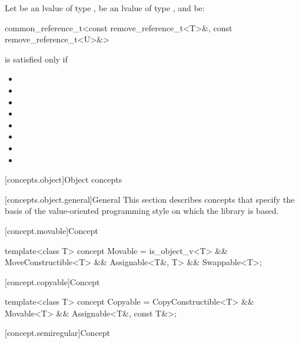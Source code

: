 \begin{itemdescr}
\pnum
Let  be an lvalue of type ,
 be an lvalue of type ,
and  be:
\begin{codeblock}
common_reference_t<const remove_reference_t<T>&, const remove_reference_t<U>&>
\end{codeblock}
 is satisfied only if

\begin{itemize}
\item {}
\item {}
\item {}
\item {}
\item {}
\item {}
\item {}
\item {}
\end{itemize}
\end{itemdescr}

[concepts.object]{Object concepts}

[concepts.object.general]{General}
\pnum
This section describes concepts that specify the basis of the
value-oriented programming style on which the library is based.

[concept.movable]{Concept }

%
\begin{itemdecl}
template<class T>
  concept Movable = is_object_v<T> && MoveConstructible<T> && Assignable<T&, T> && Swappable<T>;
\end{itemdecl}

[concept.copyable]{Concept }

%
\begin{itemdecl}
template<class T>
  concept Copyable = CopyConstructible<T> && Movable<T> && Assignable<T&, const T&>;
\end{itemdecl}

[concept.semiregular]{Concept }

